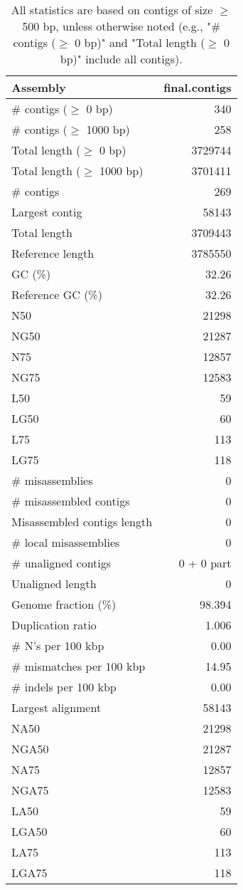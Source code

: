 \documentclass[12pt,a4paper]{article}
\begin{document}
\begin{table}[ht]
\begin{center}
\caption{All statistics are based on contigs of size $\geq$ 500 bp, unless otherwise noted (e.g., "\# contigs ($\geq$ 0 bp)" and "Total length ($\geq$ 0 bp)" include all contigs).}
\begin{tabular}{|l*{1}{|r}|}
\hline
Assembly & final.contigs \\ \hline
\# contigs ($\geq$ 0 bp) & 340 \\ \hline
\# contigs ($\geq$ 1000 bp) & 258 \\ \hline
Total length ($\geq$ 0 bp) & 3729744 \\ \hline
Total length ($\geq$ 1000 bp) & 3701411 \\ \hline
\# contigs & 269 \\ \hline
Largest contig & 58143 \\ \hline
Total length & 3709443 \\ \hline
Reference length & 3785550 \\ \hline
GC (\%) & 32.26 \\ \hline
Reference GC (\%) & 32.26 \\ \hline
N50 & 21298 \\ \hline
NG50 & 21287 \\ \hline
N75 & 12857 \\ \hline
NG75 & 12583 \\ \hline
L50 & 59 \\ \hline
LG50 & 60 \\ \hline
L75 & 113 \\ \hline
LG75 & 118 \\ \hline
\# misassemblies & 0 \\ \hline
\# misassembled contigs & 0 \\ \hline
Misassembled contigs length & 0 \\ \hline
\# local misassemblies & 0 \\ \hline
\# unaligned contigs & 0 + 0 part \\ \hline
Unaligned length & 0 \\ \hline
Genome fraction (\%) & 98.394 \\ \hline
Duplication ratio & 1.006 \\ \hline
\# N's per 100 kbp & 0.00 \\ \hline
\# mismatches per 100 kbp & 14.95 \\ \hline
\# indels per 100 kbp & 0.00 \\ \hline
Largest alignment & 58143 \\ \hline
NA50 & 21298 \\ \hline
NGA50 & 21287 \\ \hline
NA75 & 12857 \\ \hline
NGA75 & 12583 \\ \hline
LA50 & 59 \\ \hline
LGA50 & 60 \\ \hline
LA75 & 113 \\ \hline
LGA75 & 118 \\ \hline
\end{tabular}
\end{center}
\end{table}
\end{document}

